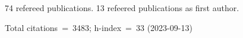 74 refereed publications. 13 refeered publications as first author.

Total citations~=~3483; h-index~=~33 (2023-09-13)